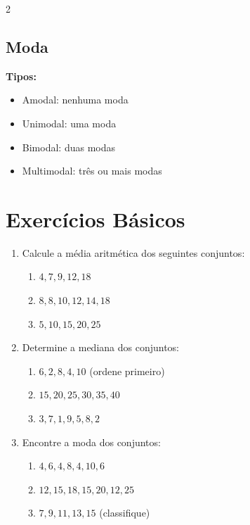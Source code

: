 \documentclass[11pt]{article}
\begin{document}
\begin{multicols}{2}
\subsection*{Moda}


\textbf{Tipos:}
\begin{itemize}
\item Amodal: nenhuma moda
\item Unimodal: uma moda
\item Bimodal: duas modas
\item Multimodal: três ou mais modas
\end{itemize}

\section*{Exercícios Básicos}

\begin{enumerate}[leftmargin=*]

\item Calcule a média aritmética dos seguintes conjuntos:
\begin{enumerate}[label=\alph*)]
\item $4, 7, 9, 12, 18$
\item $8, 8, 10, 12, 14, 18$
\item $5, 10, 15, 20, 25$
\end{enumerate}

\item Determine a mediana dos conjuntos:
\begin{enumerate}[label=\alph*)]
\item $6, 2, 8, 4, 10$ (ordene primeiro)
\item $15, 20, 25, 30, 35, 40$
\item $3, 7, 1, 9, 5, 8, 2$
\end{enumerate}

\item Encontre a moda dos conjuntos:
\begin{enumerate}[label=\alph*)]
\item $4, 6, 4, 8, 4, 10, 6$
\item $12, 15, 18, 15, 20, 12, 25$
\item $7, 9, 11, 13, 15$ (classifique)
\end{enumerate}


\end{enumerate}
\end{multicols}
\end{document}
